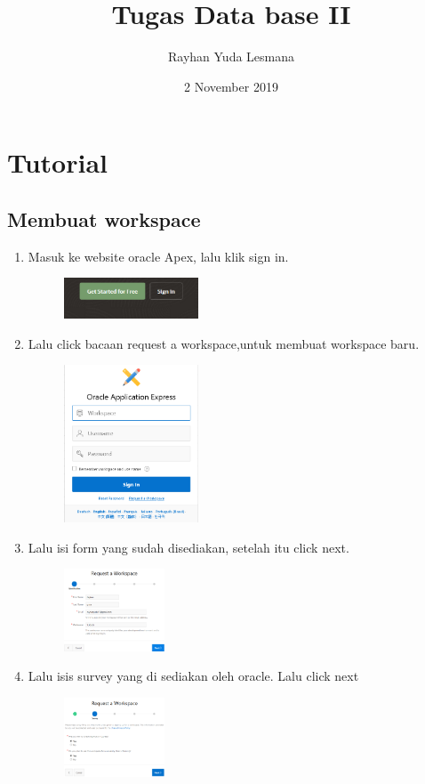 \documentclass[a4paper,12pt]{report}
\title{Tugas Data base II}
\author{Rayhan Yuda Lesmana}
\date{2 November 2019}
\begin{document}
\maketitle

\chapter{Tutorial}

\section*{Membuat workspace}
\begin{enumerate}

\item 
Masuk  ke website oracle Apex, lalu klik sign in.
\begin{figure}[h]
\includegraphics[width=4cm]{gambar/1.png}
\end{figure}

\item
Lalu click bacaan request a workspace,untuk membuat workspace baru.
\begin{figure}[h]
\includegraphics[width=4cm]{gambar/2.png}
\end{figure}

\newpage
\item
Lalu isi form yang sudah disediakan, setelah itu click next.
\begin{figure}[h]
\includegraphics[width=3cm]{gambar/3.png}
\end{figure}

\item
Lalu isis survey yang di sediakan oleh oracle. Lalu click next
\begin{figure}[h]
\includegraphics[width=3cm]{gambar/4.png}
\end{figure}


\end{enumerate}
\end{document}
